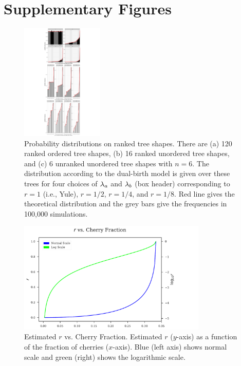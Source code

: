 \section{Supplementary Figures}
\begin{figure} %
\centering
\includegraphics[width=0.35\textwidth]{figs/dualbirth-tree-prob-dists}
\caption[Probability Distributions on Ranked Tree Shapes]
{Probability distributions on ranked tree shapes. There are (a) 120 ranked ordered tree shapes, (b) 16 ranked unordered tree shapes, and (c) 6 unranked unordered tree shapes with $n=6$. The distribution according to the dual-birth model is given over these trees for four choices of $\lambda_a$ and $\lambda_b$ (box header) corresponding to $r=1$ (i.e., Yule), $r=1/2$, $r=1/4$, and $r=1/8$. Red line gives the theoretical distribution and the grey bars give the frequencies in 100,000 simulations.}
\label{fig:dualbirth-tree-prob-dists}
\end{figure}

\begin{figure} %
\centering
\includegraphics[width=0.8\textwidth]{figs/dualbirth-sup-cvsr}
\caption[Estimated $r$ vs. Cherry Fraction]
{Estimated $r$ vs. Cherry Fraction. Estimated $r$ ($y$-axis) as a function of the fraction of cherries ($x$-axis). Blue (left axis) shows normal scale and green (right) shows the logarithmic scale.}
\label{fig:dualbirth-sup-cvsr}
\end{figure}

